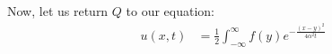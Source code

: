 \begin{enumerate}
  Now, let us return $Q$ to our equation:
  \begin{align}
    u(x, t) & = \frac{1}{2} \int^\infty_{-\infty} f(y) e^{-\frac{(x - y)^2}{4 \alpha^2 t}}
  \end{align}

\end{enumerate}
